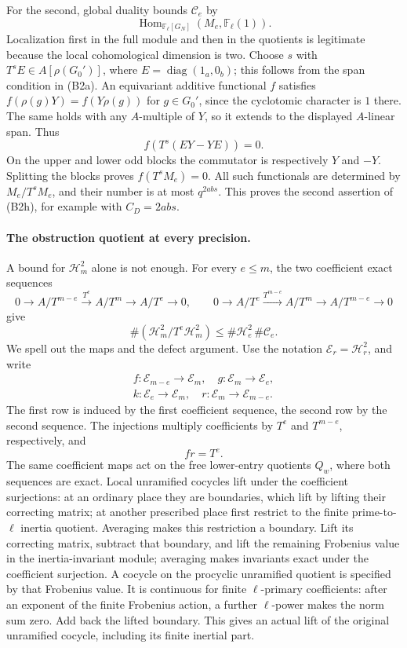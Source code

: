 For the second, global duality bounds \(\mathcal C_e\) by
\[
 \operatorname{Hom}_{\mathbb F_\ell[G_N]}(M_e,\mathbb F_\ell(1)).
\]
Localization first in the full module and then in the quotients
is legitimate because the local cohomological dimension is two.
Choose \(s\) with \(T^sE\in A[\rho(G_0')]\), where
\(E=\operatorname{diag}(1_a,0_b)\); this follows from the span
condition in (B2a).
An equivariant additive functional \(f\) satisfies
\(f(\rho(g)Y)=f(Y\rho(g))\) for \(g\in G_0'\), since the
cyclotomic character is \(1\) there.
The same holds with any \(A\)-multiple of \(Y\), so it extends to
the displayed \(A\)-linear span.
Thus
\[
                   f(T^s(EY-YE))=0 .
\]
On the upper and lower odd blocks the commutator is respectively
\(Y\) and \(-Y\).  Splitting the blocks proves
\(f(T^sM_e)=0\).
All such functionals are determined by \(M_e/T^sM_e\), and their
number is at most \(q^{2abs}\).
This proves the second assertion of (B2h), for example with
\(C_D=2abs\).

\paragraph{The obstruction quotient at every precision.}
A bound for \(\mathcal H^2_m\) alone is not enough.
For every \(e\leq m\), the two coefficient exact sequences
\[
 0\to A/T^{m-e}\xrightarrow{T^e}A/T^m\to A/T^e\to0,\qquad
 0\to A/T^e\xrightarrow{T^{m-e}}A/T^m\to A/T^{m-e}\to0
\]
give
\[
 \#(\mathcal H^2_m/T^e\mathcal H^2_m)
                         \leq\#\mathcal H^2_e\,\#\mathcal C_e.
 \tag{B2i}
\]
We spell out the maps and the defect argument.
Use the notation \(\mathcal E_r=\mathcal H^2_r\), and write
\[
 \begin{array}{c}
 f:\mathcal E_{m-e}\longrightarrow\mathcal E_m,\quad
 g:\mathcal E_m\longrightarrow\mathcal E_e,\\
 k:\mathcal E_e\longrightarrow\mathcal E_m,\quad
 r:\mathcal E_m\longrightarrow\mathcal E_{m-e}.
 \end{array}
\]
The first row is induced by the first coefficient sequence, the
second row by the second sequence.  The injections multiply
coefficients by \(T^e\) and \(T^{m-e}\), respectively, and
\[
                         f r=T^e .
 \tag{B2i1}
\]
The same coefficient maps act on the free lower-entry quotients
\(Q_w\), where both sequences are exact.
Local unramified cocycles lift under the coefficient surjections:
at an ordinary place they are boundaries, which lift by lifting
their correcting matrix; at another prescribed place first restrict to the finite
prime-to-\(\ell\) inertia quotient.
Averaging makes this restriction a boundary.
Lift its correcting matrix, subtract that boundary, and lift
the remaining Frobenius value in the inertia-invariant module;
averaging makes invariants exact under the coefficient
surjection.
A cocycle on the procyclic unramified quotient is specified
by that Frobenius value.
It is continuous for finite \(\ell\)-primary coefficients:
after an exponent of the finite Frobenius action, a further
\(\ell\)-power makes the norm sum zero.
Add back the lifted boundary.
This gives an actual lift of the original unramified cocycle,
including its finite inertial part.

